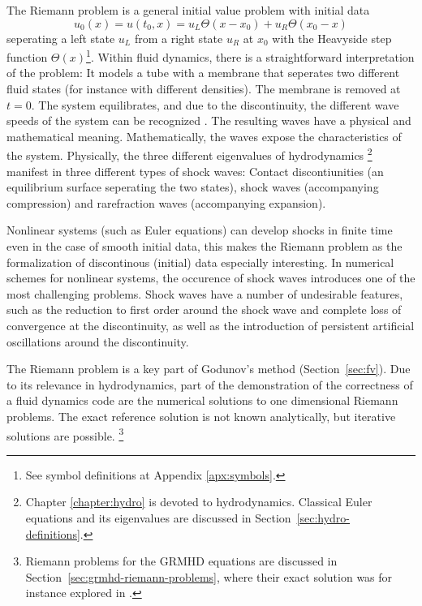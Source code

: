 The Riemann problem is a general initial value problem with initial data
\begin{equation}\label{eq.intro.riemann-problem}
u_0(x) = u(t_0,x) =  u_L \Theta(x-x_0) + u_R \Theta(x_0-x)
\end{equation}
seperating a left state $u_L$ from a right state $u_R$ at $x_0$ with the
Heavyside step function $\Theta(x)$\footnote{
  See symbol definitions at Appendix \vref{apx:symbols}.
}. Within fluid dynamics, there is a straightforward interpretation of the
problem: It models a tube with a membrane that seperates two different
fluid states (for instance with different densities). The membrane is removed
at $t=0$. The system equilibrates, and due to the discontinuity, the different
wave speeds of the system can be recognized
\cite{Toro99,Leveque92}. The resulting waves
have a physical and mathematical meaning. Mathematically, the waves expose
the characteristics of the system. Physically, the three different eigenvalues
of hydrodynamics
\footnote{
  Chapter \ref{chapter:hydro} is devoted to hydrodynamics. Classical
  Euler equations and its eigenvalues are discussed
  in Section~\vref{sec:hydro-definitions}.
} manifest in three different types of shock waves:
Contact discontiunities (an equilibrium surface seperating the two states),
shock waves (accompanying compression) and rarefraction waves (accompanying
expansion).

Nonlinear systems (such as Euler equations)
can develop shocks in finite time even in the case of
smooth initial data, this makes the Riemann problem as the formalization
of discontinous (initial) data especially interesting. 
In numerical schemes for nonlinear systems, the occurence of shock waves
introduces one of the most challenging problems. Shock waves have a number
of undesirable features, such as the reduction to first order around
the shock wave and complete loss of convergence at the discontinuity, as well as
the introduction of persistent artificial oscillations around the discontinuity.

The Riemann problem is a key part of Godunov's method (Section~\ref{sec:fv}).
Due to its relevance in hydrodynamics, part of the demonstration of the
correctness of a fluid dynamics code are the numerical solutions to
one dimensional Riemann problems.
The exact reference solution is not known analytically, but iterative
solutions are possible.
\footnote{Riemann problems for the GRMHD equations are discussed in 
	Section~\vref{sec:grmhd-riemann-problems}, where their exact solution
	was for instance explored in \cite{Giacomazzo:2005jy}.}


